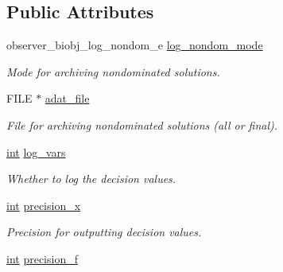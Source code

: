 \subsection*{Public Attributes}
\begin{DoxyCompactItemize}
\item 
observer\+\_\+biobj\+\_\+log\+\_\+nondom\+\_\+e \hyperlink{structlogger__biobj__data__t_ad582ac426d2a494a48fc4cfcb0362a90}{log\+\_\+nondom\+\_\+mode}\hypertarget{structlogger__biobj__data__t_ad582ac426d2a494a48fc4cfcb0362a90}{}\label{structlogger__biobj__data__t_ad582ac426d2a494a48fc4cfcb0362a90}

\begin{DoxyCompactList}\small\item\em Mode for archiving nondominated solutions. \end{DoxyCompactList}\item 
F\+I\+LE $\ast$ \hyperlink{structlogger__biobj__data__t_aa63d80fc2cc05d46824e284519945c66}{adat\+\_\+file}\hypertarget{structlogger__biobj__data__t_aa63d80fc2cc05d46824e284519945c66}{}\label{structlogger__biobj__data__t_aa63d80fc2cc05d46824e284519945c66}

\begin{DoxyCompactList}\small\item\em File for archiving nondominated solutions (all or final). \end{DoxyCompactList}\item 
\hyperlink{classint}{int} \hyperlink{structlogger__biobj__data__t_a545f9444fa68ac2ecc09ebd8e6544914}{log\+\_\+vars}\hypertarget{structlogger__biobj__data__t_a545f9444fa68ac2ecc09ebd8e6544914}{}\label{structlogger__biobj__data__t_a545f9444fa68ac2ecc09ebd8e6544914}

\begin{DoxyCompactList}\small\item\em Whether to log the decision values. \end{DoxyCompactList}\item 
\hyperlink{classint}{int} \hyperlink{structlogger__biobj__data__t_a0d632e5abb4d4bc498c3615c646f1783}{precision\+\_\+x}\hypertarget{structlogger__biobj__data__t_a0d632e5abb4d4bc498c3615c646f1783}{}\label{structlogger__biobj__data__t_a0d632e5abb4d4bc498c3615c646f1783}

\begin{DoxyCompactList}\small\item\em Precision for outputting decision values. \end{DoxyCompactList}\item 
\hyperlink{classint}{int} \hyperlink{structlogger__biobj__data__t_ac536147688d622ce3cd2eeba6505c154}{precision\+\_\+f}\hypertarget{structlogger__biobj__data__t_ac536147688d622ce3cd2eeba6505c154}{}\label{structlogger__biobj__data__t_ac536147688d622ce3cd2eeba6505c154}


\end{DoxyCompactItemize}
